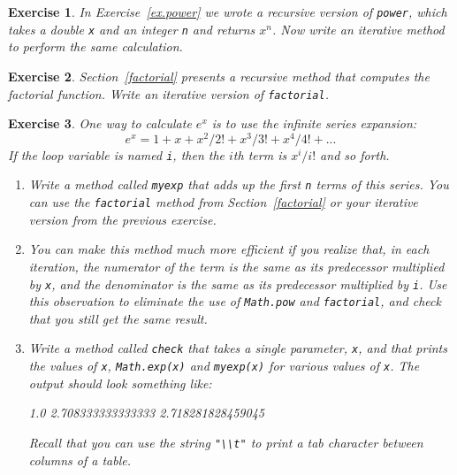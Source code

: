 \documentclass[12pt]{book}
\theoremstyle{exercise}
\newtheorem{exercise}{Exercise}[chapter]
\newcommand{\java}[1]{\lstinline{#1}} %
\begin{document}
\begin{exercise}
In Exercise~\ref{ex.power} we wrote a recursive version of {\tt power}, which takes a double {\tt x} and an integer {\tt n} and returns $x^n$.
Now write an iterative method to perform the same calculation.
\end{exercise}

\begin{exercise}
Section~\ref{factorial} presents a recursive method that computes the factorial function.
Write an iterative version of {\tt factorial}.
\end{exercise}

\begin{exercise}
One way to calculate $e^x$ is to use the infinite series expansion:
%
\begin{equation*}
e^x = 1 + x + x^2 / 2! + x^3 / 3! + x^4 / 4! + ...
\end{equation*}
%
If the loop variable is named {\tt i}, then the $i$th term is $x^i / i!$ and so forth.

\begin{enumerate}

\item Write a method called {\tt myexp} that adds up the first {\tt n} terms of this series.
You can use the {\tt factorial} method from Section~\ref{factorial} or your iterative version from the previous exercise.

\item You can make this method much more efficient if you realize that, in each iteration, the numerator of the term is the same as its predecessor multiplied by {\tt x}, and the denominator is the same as its predecessor multiplied by {\tt i}.
Use this observation to eliminate the use of {\tt Math.pow} and {\tt factorial}, and check that you still get the same result.

\item Write a method called {\tt check} that takes a single parameter, {\tt x}, and that prints the values of {\tt x}, {\tt Math.exp(x)} and {\tt myexp(x)} for various values of {\tt x}.
The output should look something like:

\begin{stdout}
1.0     2.708333333333333     2.718281828459045
\end{stdout}

Recall that you can use the string \java{"\\t"} to print a tab character between columns of a table.


\end{enumerate}
\end{exercise}
\end{document}
